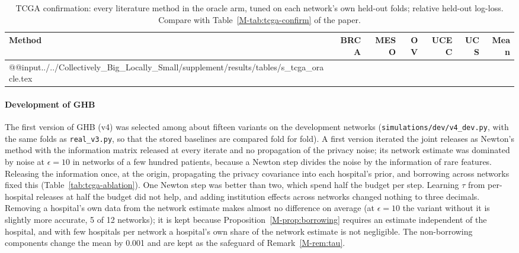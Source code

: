 \documentclass[acmsmall,screen,nonacm]{acmart}
\theoremstyle{acmdefinition}
\begin{document}
\begin{table}[t]
\caption{TCGA confirmation: every literature method in the oracle arm, tuned on each network's own held-out folds; relative held-out log-loss. Compare with Table~\ref{M-tab:tcga-confirm} of the paper.}
\label{tab:tcga-oracle}
\scriptsize
\begin{tabular}{@{}lrrrrrr@{}}
\toprule
Method & BRCA & MESO & OV & UCEC & UCS & Mean\\
\midrule
\csname @@input\endcsname../../Collectively_Big_Locally_Small/supplement/results/tables/s_tcga_oracle.tex 
\bottomrule
\end{tabular}
\end{table}

\paragraph{Development of GHB} The first version of GHB (v4) was selected among about fifteen variants on the development networks (\texttt{simulations/dev/v4\_dev.py}, with the same folds as \texttt{real\_v3.py}, so that the stored baselines are compared fold for fold). A first version iterated the joint releases as Newton's method with the information matrix released at every iterate and no propagation of the privacy noise; its network estimate was dominated by noise at $\epsilon=10$ in networks of a few hundred patients, because a Newton step divides the noise by the information of rare features. Releasing the information once, at the origin, propagating the privacy covariance into each hospital's prior, and borrowing across networks fixed this (Table~\ref{tab:tcga-ablation}). One Newton step was better than two, which spend half the budget per step. Learning $\tau$ from per-hospital releases at half the budget did not help, and adding institution effects across networks changed nothing to three decimals. Removing a hospital's own data from the network estimate makes almost no difference on average (at $\epsilon=10$ the variant without it is slightly more accurate, 5 of 12 networks); it is kept because Proposition~\ref{M-prop:borrowing} requires an estimate independent of the hospital, and with few hospitals per network a hospital's own share of the network estimate is not negligible. The non-borrowing components change the mean by 0.001 and are kept as the safeguard of Remark~\ref{M-rem:tau}.
\end{document}
